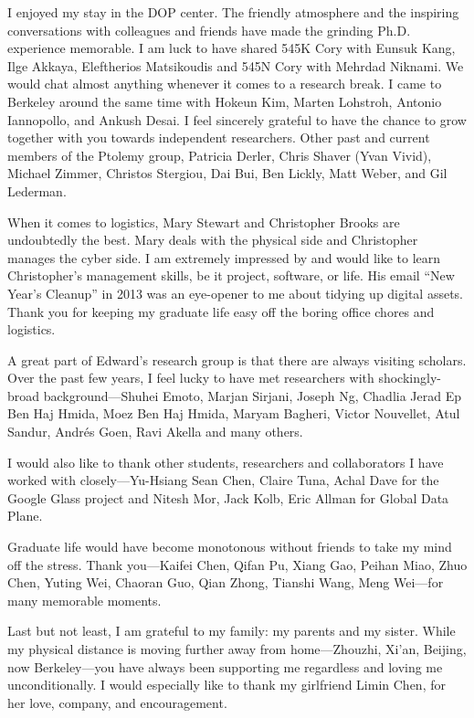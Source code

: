 \documentclass[thesis.tex]{subfiles}
\begin{document}
\begin{acknowledgements}
  I enjoyed my stay in the DOP center. The friendly atmosphere and the inspiring
  conversations with colleagues and friends have made the grinding
  Ph.D. experience memorable. I am luck to have shared 545K Cory with Eunsuk
  Kang, Ilge Akkaya, Eleftherios Matsikoudis and 545N Cory with Mehrdad
  Niknami. We would chat almost anything whenever it comes to a research break.
  I came to Berkeley around the same time with Hokeun Kim, Marten Lohstroh,
  Antonio Iannopollo, and Ankush Desai. I feel sincerely grateful to have the
  chance to grow together with you towards independent researchers. Other past
  and current members of the Ptolemy group, Patricia Derler, Chris Shaver (Yvan
  Vivid), Michael Zimmer, Christos Stergiou, Dai Bui, Ben Lickly, Matt Weber,
  and Gil Lederman.

  When it comes to logistics, Mary Stewart and Christopher Brooks are
  undoubtedly the best. Mary deals with the physical side and Christopher
  manages the cyber side. I am extremely impressed by and would like to learn
  Christopher's management skills, be it project, software, or life. His email
  ``New Year's Cleanup'' in 2013 was an eye-opener to me about tidying up
  digital assets. Thank you for keeping my graduate life easy off the boring
  office chores and logistics.

  A great part of Edward's research group is that there are always visiting
  scholars. Over the past few years, I feel lucky to have met researchers with
  shockingly-broad background---Shuhei Emoto, Marjan Sirjani, Joseph Ng, Chadlia
  Jerad Ep Ben Haj Hmida, Moez Ben Haj Hmida, Maryam Bagheri, Victor Nouvellet,
  Atul Sandur, Andr\'es Goen, Ravi Akella and many others.

  I would also like to thank other students, researchers and collaborators I
  have worked with closely---Yu-Hsiang Sean Chen, Claire Tuna, Achal Dave for
  the Google Glass project and Nitesh Mor, Jack Kolb, Eric Allman for Global
  Data Plane.

  Graduate life would have become monotonous without friends to take my mind off
  the stress. Thank you---Kaifei Chen, Qifan Pu, Xiang Gao, Peihan Miao, Zhuo
  Chen, Yuting Wei, Chaoran Guo, Qian Zhong, Tianshi Wang, Meng Wei---for many
  memorable moments.

  Last but not least, I am grateful to my family: my parents and my
  sister. While my physical distance is moving further away from home---Zhouzhi,
  Xi'an, Beijing, now Berkeley---you have always been supporting me regardless
  and loving me unconditionally. I would especially like to thank my girlfriend
  Limin Chen, for her love, company, and encouragement.

\end{acknowledgements}
\end{document}

